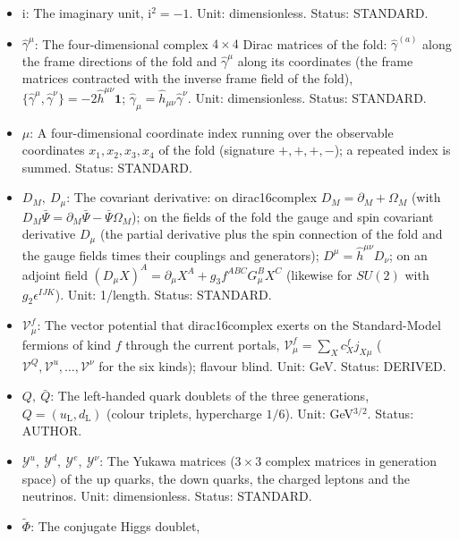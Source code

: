 \documentclass[
  10pt,
]{article}
\providecommand{\tightlist}{%
  \setlength{\itemsep}{0pt}\setlength{\parskip}{0pt}}
\begin{document}
\begin{itemize}
\tightlist
\item
  \(\mathrm{i}\): The imaginary unit, \(\mathrm{i}^2 = -1\). Unit:
  dimensionless. Status: STANDARD.
\item
  \(\hat\gamma^\mu\): The four-dimensional complex \(4 \times 4\) Dirac
  matrices of the fold: \(\hat\gamma^{(a)}\) along the frame directions
  of the fold and \(\hat\gamma^\mu\) along its coordinates (the frame
  matrices contracted with the inverse frame field of the fold),
  \(\{\hat\gamma^\mu, \hat\gamma^\nu\} = -2\hat h^{\mu\nu}\mathbf{1}\);
  \(\hat\gamma_\mu = \hat h_{\mu\nu}\hat\gamma^\nu\). Unit:
  dimensionless. Status: STANDARD.
\item
  \(\mu\): A four-dimensional coordinate index running over the
  observable coordinates \(x_1, x_2, x_3, x_4\) of the fold (signature
  \(+,+,+,-\)); a repeated index is summed. Status: STANDARD.
\item
  \(D_M,\ D_\mu\): The covariant derivative: on dirac16complex
  \(D_M = \partial_M + \Omega_M\) (with
  \(D_M\bar\Psi = \partial_M\bar\Psi - \bar\Psi\Omega_M\)); on the
  fields of the fold the gauge and spin covariant derivative \(D_\mu\)
  (the partial derivative plus the spin connection of the fold and the
  gauge fields times their couplings and generators);
  \(D^\mu = \hat h^{\mu\nu}D_\nu\); on an adjoint field
  \((D_\mu X)^A = \partial_\mu X^A + g_3f^{ABC}G^B_\mu X^C\) (likewise
  for \(SU(2)\) with \(g_2\epsilon^{IJK}\)). Unit: 1/length. Status:
  STANDARD.
\item
  \(\mathcal{V}^{f}_\mu\): The vector potential that dirac16complex
  exerts on the Standard-Model fermions of kind \(f\) through the
  current portals, \(\mathcal{V}^{f}_\mu = \sum_Xc^{f}_Xj_{X\mu}\)
  (\(\mathcal{V}^{Q}, \mathcal{V}^{u}, \dots, \mathcal{V}^{\nu}\) for
  the six kinds); flavour blind. Unit: GeV. Status: DERIVED.
\item
  \(Q,\ \bar Q\): The left-handed quark doublets of the three
  generations, \(Q = (u_{\mathrm{L}}, d_{\mathrm{L}})\) (colour
  triplets, hypercharge \(1/6\)). Unit: GeV\(^{3/2}\). Status: AUTHOR.
\item
  \(\mathcal{Y}^{u},\ \mathcal{Y}^{d},\ \mathcal{Y}^{e},\ \mathcal{Y}^{\nu}\):
  The Yukawa matrices (\(3 \times 3\) complex matrices in generation
  space) of the up quarks, the down quarks, the charged leptons and the
  neutrinos. Unit: dimensionless. Status: STANDARD.
\item
  \(\tilde\Phi\): The conjugate Higgs doublet,

\end{itemize}
\end{document}
